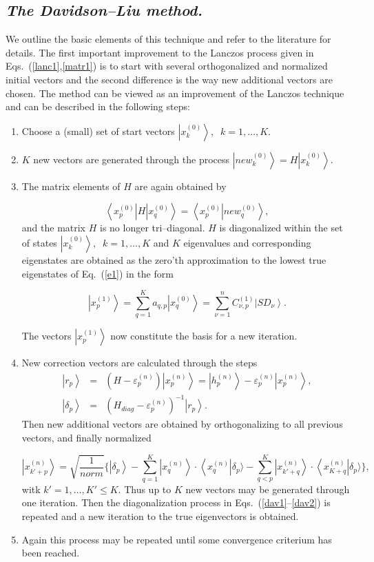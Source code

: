 \documentclass{article}
\newcommand{\be}{\begin{equation}}
\newcommand{\ee}{\end{equation}}
\newcommand{\bra}[1]{\left\langle #1 \right|}
\newcommand{\ket}[1]{\left| #1 \right\rangle}
\begin{document}
\subsection{\it The Davidson--Liu method.}
%
We outline the basic elements of this technique and refer to
the literature \cite{dav89} for details.
The first important improvement to the Lanczos process given in
Eqs.~(\ref{lanc1},\ref{matr1}) is to start with
several orthogonalized  and normalized initial vectors
and the second difference is the  way new additional vectors
are chosen. The method can be viewed
as an improvement of the Lanczos technique and can be described
in the following steps:
%
\begin{enumerate}
%
\item Choose a (small) set  of start vectors
$\ket{x_k^{(0)}},\;\; k = 1,\ldots, K$.
%
\item $K$ new vectors are generated through the process
$\ket{new_k^{(0)}} = H \ket{x_k^{(0)}}$.
%
\item The matrix elements of $H$ are again obtained by

%
\be
\bra{x_p^{(0)}} H \ket{x_q^{(0)}}
= \bra{x_p^{(0)}} \left . new_q^{(0)}\right \rangle,
\label{dav1}
\ee
%
and the matrix $H$ is no longer tri--diagonal.
$H$ is diagonalized within the set of states
$\ket{x_k^{(0)}},\;\; k = 1, \ldots, K$
and $K$ eigenvalues and corresponding eigenstates are obtained
as the zero'th approximation to the lowest true eigenstates
of Eq.~(\ref{e1}) in the form
%

\be
\ket{x_p^{(1)}} = \sum_{q = 1}^{K} a_{q, p} \ket{x_q^{(0)}}
                = \sum_{\nu = 1}^{n} C_{\nu,p}^{(1)} \ket{SD_{\nu}}.
\label{dav2}
\ee

%
The vectors $\ket{x_p^{(1)}}$ now constitute the basis for a new iteration.
%
\item New correction vectors are calculated through the steps
%
%
\begin{eqnarray}
\ket{r_p} &=&(H - \varepsilon_p^{(n)}) \ket{x_p^{(n)}}
	 =\ket{h_p^{(n)}} - \varepsilon_p^{(n)} \ket{x_p^{(n)}},
			                       \nonumber\\
\ket{\delta_p} &=& (H_{diag}-\varepsilon_p^{(n)})^{-1} \ket{r_p}.
\label{dav3}
\end{eqnarray}
%
Then new additional vectors are obtained by orthogonalizing
to all previous vectors, and finally normalized
%

\be
\ket{x_{k'+p}^{(n)}}
	= \sqrt{\frac{1}{norm}} \{ \ket{\delta_p}
		  -\sum_{q=1}^K \ket{x_q^{(n)}} \cdot
	                    \bra{x_q^{(n)}} \delta_p \rangle 
  -\sum_{q<p}^K \ket{x_{k'+q}^{(n)}} \cdot \bra{x_{K+q}^{(n)}}
		                  \delta_p \rangle  \},
\ee
%
witk $k' = 1, \ldots, K' \leq K$. Thus up to $K$ new vectors
may be generated through one iteration.
Then the diagonalization process in Eqs.~(\ref{dav1}--\ref{dav2}) is
repeated and a new iteration to the true eigenvectors is obtained.
%
\item Again this process may be repeated until some convergence
criterium has been reached.
%
\end{enumerate}
%
\end{document}
